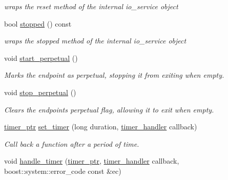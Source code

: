 \begin{DoxyCompactItemize}
\begin{DoxyCompactList}\small\item\em wraps the reset method of the internal io\+\_\+service object \end{DoxyCompactList}\item 
bool \hyperlink{classwebsocketpp_1_1transport_1_1asio_1_1endpoint_a633264e7fd0ab7623cac336f2eb85aa0}{stopped} () const\hypertarget{classwebsocketpp_1_1transport_1_1asio_1_1endpoint_a633264e7fd0ab7623cac336f2eb85aa0}{}\label{classwebsocketpp_1_1transport_1_1asio_1_1endpoint_a633264e7fd0ab7623cac336f2eb85aa0}

\begin{DoxyCompactList}\small\item\em wraps the stopped method of the internal io\+\_\+service object \end{DoxyCompactList}\item 
void \hyperlink{classwebsocketpp_1_1transport_1_1asio_1_1endpoint_a5a707078d482c141edf0a8cdd0bc6345}{start\+\_\+perpetual} ()
\begin{DoxyCompactList}\small\item\em Marks the endpoint as perpetual, stopping it from exiting when empty. \end{DoxyCompactList}\item 
void \hyperlink{classwebsocketpp_1_1transport_1_1asio_1_1endpoint_aaaf8c9ef3f41be6968674bd704dc23b0}{stop\+\_\+perpetual} ()
\begin{DoxyCompactList}\small\item\em Clears the endpoint\textquotesingle{}s perpetual flag, allowing it to exit when empty. \end{DoxyCompactList}\item 
\hyperlink{classwebsocketpp_1_1transport_1_1asio_1_1endpoint_a29e73e24476c2b3cef35963613653450}{timer\+\_\+ptr} \hyperlink{classwebsocketpp_1_1transport_1_1asio_1_1endpoint_a63525bd209bb3dabf373b9b72d37e78e}{set\+\_\+timer} (long duration, \hyperlink{namespacewebsocketpp_1_1transport_a946cc56ff41139f3002149c15fd87bc9}{timer\+\_\+handler} callback)
\begin{DoxyCompactList}\small\item\em Call back a function after a period of time. \end{DoxyCompactList}\item 
void \hyperlink{classwebsocketpp_1_1transport_1_1asio_1_1endpoint_ae28c4db68f93d3afa650a62159b0b479}{handle\+\_\+timer} (\hyperlink{classwebsocketpp_1_1transport_1_1asio_1_1endpoint_a29e73e24476c2b3cef35963613653450}{timer\+\_\+ptr}, \hyperlink{namespacewebsocketpp_1_1transport_a946cc56ff41139f3002149c15fd87bc9}{timer\+\_\+handler} callback, boost\+::system\+::error\+\_\+code const \&ec)

\end{DoxyCompactItemize}
